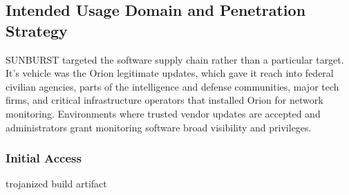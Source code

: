 \documentclass[conference]{IEEEtran}
\begin{document}
\subsection*{Intended Usage Domain and Penetration Strategy}
SUNBURST targeted the software supply chain rather than a particular target. It's vehicle was the Orion legitimate updates, which gave it reach into federal civilian agencies,
parts of the intelligence and defense communities, major tech firms, and critical infrastructure operators that installed Orion for network monitoring. Environments where trusted
vendor updates are accepted and administrators grant monitoring software broad visibility and privileges.
\subsubsection{Initial Access}
trojanized build artifact
\end{document}
